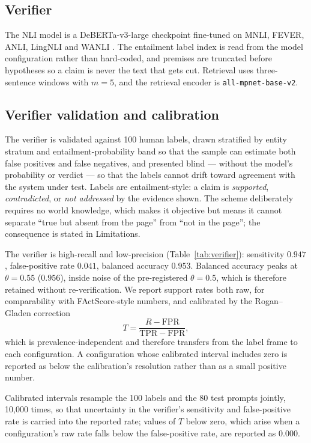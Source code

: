 \documentclass[11pt]{article}
\begin{document}
\subsection{Verifier}

The NLI model is a DeBERTa-v3-large checkpoint \citep{he2023debertav3}
fine-tuned on MNLI, FEVER, ANLI, LingNLI and WANLI \citep{laurer2024nli}. The
entailment label index is read from the model configuration rather than
hard-coded, and premises are truncated before hypotheses so a claim is never
the text that gets cut. Retrieval uses three-sentence windows
with $m=5$, and the retrieval encoder is \texttt{all-mpnet-base-v2}.

\subsection{Verifier validation and calibration}

The verifier is validated against 100 human labels, drawn stratified by entity
stratum and entailment-probability band so that the sample can estimate both
false positives and false negatives, and presented blind --- without the
model's probability or verdict --- so that the labels cannot drift toward
agreement with the system under test. Labels are entailment-style: a claim is
\emph{supported}, \emph{contradicted}, or \emph{not addressed} by the evidence
shown. The scheme deliberately requires no world knowledge, which makes it
objective but means it cannot separate ``true but absent from the page'' from
``not in the page''; the consequence is stated in Limitations.

The verifier is high-recall and low-precision (Table~\ref{tab:verifier}):
sensitivity $0.947$, false-positive rate $0.041$, balanced accuracy $0.953$.
Balanced accuracy peaks at $\theta=0.55$ ($0.956$), inside noise of the
pre-registered $\theta=0.5$, which is therefore retained without
re-verification. We report support rates both raw, for comparability with
FActScore-style numbers, and calibrated by the Rogan--Gladen correction
\[
T = \frac{R - \mathrm{FPR}}{\mathrm{TPR} - \mathrm{FPR}},
\]
which is prevalence-independent and therefore transfers from the label frame to
each configuration. A configuration whose calibrated interval includes zero is
reported as below the calibration's resolution rather than as a small positive
number.

Calibrated intervals resample the 100 labels and the 80 test prompts jointly,
10{,}000 times, so that uncertainty in the verifier's sensitivity and
false-positive rate is carried into the reported rate; values of $T$ below zero,
which arise when a configuration's raw rate falls below the false-positive rate,
are reported as $0.000$.
\end{document}
